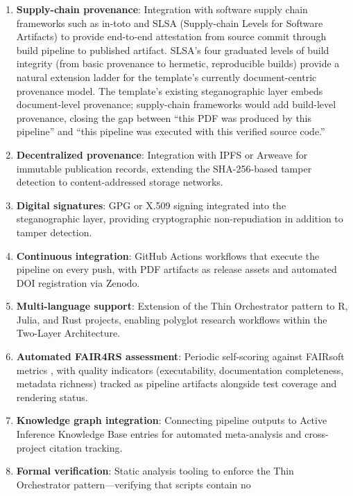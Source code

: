 \documentclass[
  english,
]{article}
\providecommand{\tightlist}{%
  \setlength{\itemsep}{0pt}\setlength{\parskip}{0pt}}
\begin{document}
\begin{enumerate}
\def\labelenumi{\arabic{enumi}.}
\tightlist
\item
  \textbf{Supply-chain provenance}: Integration with software supply
  chain frameworks such as in-toto \citep{torresarias2019intoto} and
  SLSA (Supply-chain Levels for Software Artifacts)
  \citep{openssf2023slsa} to provide end-to-end attestation from source
  commit through build pipeline to published artifact. SLSA's four
  graduated levels of build integrity (from basic provenance to
  hermetic, reproducible builds) provide a natural extension ladder for
  the template's currently document-centric provenance model. The
  template's existing steganographic layer embeds document-level
  provenance; supply-chain frameworks would add build-level provenance,
  closing the gap between ``this PDF was produced by this pipeline'' and
  ``this pipeline was executed with this verified source code.''
\item
  \textbf{Decentralized provenance}: Integration with IPFS or Arweave
  for immutable publication records, extending the SHA-256-based tamper
  detection to content-addressed storage networks.
\item
  \textbf{Digital signatures}: GPG or X.509 signing integrated into the
  steganographic layer, providing cryptographic non-repudiation in
  addition to tamper detection.
\item
  \textbf{Continuous integration}: GitHub Actions workflows that execute
  the pipeline on every push, with PDF artifacts as release assets and
  automated DOI registration via Zenodo.
\item
  \textbf{Multi-language support}: Extension of the Thin Orchestrator
  pattern to R, Julia, and Rust projects, enabling polyglot research
  workflows within the Two-Layer Architecture.
\item
  \textbf{Automated FAIR4RS assessment}: Periodic self-scoring against
  FAIRsoft metrics \citep{garijo2024fairsoft}, with quality indicators
  (executability, documentation completeness, metadata richness) tracked
  as pipeline artifacts alongside test coverage and rendering status.
\item
  \textbf{Knowledge graph integration}: Connecting pipeline outputs to
  Active Inference Knowledge Base entries for automated meta-analysis
  and cross-project citation tracking.
\item
  \textbf{Formal verification}: Static analysis tooling to enforce the
  Thin Orchestrator pattern---verifying that scripts contain no

\end{enumerate}
\end{document}
